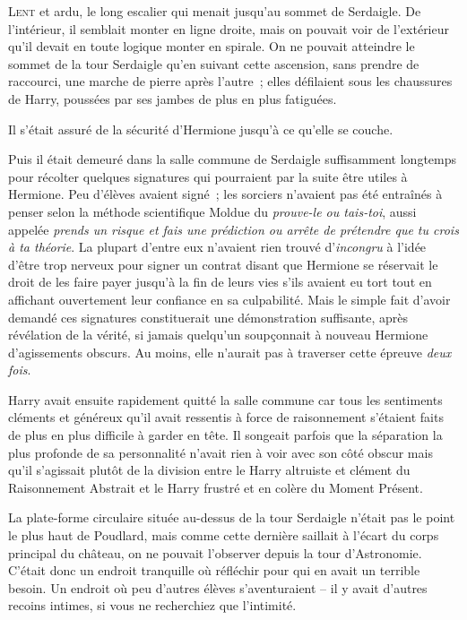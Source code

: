 
\lettrine{L}{ent} et ardu, le long escalier qui menait jusqu'au sommet de Serdaigle. De l'intérieur, il semblait monter en ligne droite, mais on pouvait voir de l'extérieur qu'il devait en toute logique monter en spirale. On ne pouvait atteindre le sommet de la tour Serdaigle qu'en suivant cette ascension, sans prendre de raccourci, une marche de pierre après l'autre~; elles défilaient sous les chaussures de Harry, poussées par ses jambes de plus en plus fatiguées.

Il s'était assuré de la sécurité d'Hermione jusqu'à ce qu'elle se couche.

Puis il était demeuré dans la salle commune de Serdaigle suffisamment longtemps pour récolter quelques signatures qui pourraient par la suite être utiles à Hermione. Peu d'élèves avaient signé~; les sorciers n'avaient pas été entraînés à penser selon la méthode scientifique Moldue du \emph{prouve-le ou tais-toi}, aussi appelée \emph{prends un risque et fais une prédiction ou arrête de prétendre que tu crois à ta théorie}. La plupart d'entre eux n'avaient rien trouvé d'\emph{incongru} à l'idée d'être trop nerveux pour signer un contrat disant que Hermione se réservait le droit de les faire payer jusqu'à la fin de leurs vies s'ils avaient eu tort tout en affichant ouvertement leur confiance en sa culpabilité. Mais le simple fait d'avoir demandé ces signatures constituerait une démonstration suffisante, après révélation de la vérité, si jamais quelqu'un soupçonnait à nouveau Hermione d'agissements obscurs. Au moins, elle n'aurait pas à traverser cette épreuve \emph{deux fois}.

Harry avait ensuite rapidement quitté la salle commune car tous les sentiments cléments et généreux qu'il avait ressentis à force de raisonnement s'étaient faits de plus en plus difficile à garder en tête. Il songeait parfois que la séparation la plus profonde de sa personnalité n'avait rien à voir avec son côté obscur mais qu'il s'agissait plutôt de la division entre le Harry altruiste et clément du Raisonnement Abstrait et le Harry frustré et en colère du Moment Présent.

La plate-forme circulaire située au-dessus de la tour Serdaigle n'était pas le point le plus haut de Poudlard, mais comme cette dernière saillait à l'écart du corps principal du château, on ne pouvait l'observer depuis la tour d'Astronomie. C'était donc un endroit tranquille où réfléchir pour qui en avait un terrible besoin. Un endroit où peu d'autres élèves s'aventuraient -- il y avait d'autres recoins intimes, si vous ne recherchiez que l'intimité.

